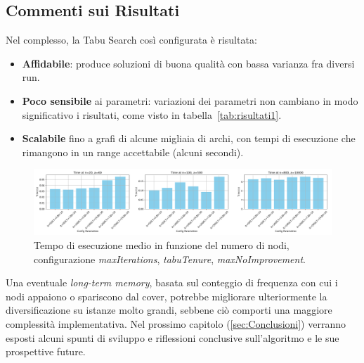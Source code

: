 \subsection{Commenti sui Risultati}

Nel complesso, la Tabu Search così configurata è risultata:
\begin{itemize}
    \item \textbf{Affidabile}: produce soluzioni di buona qualità con bassa varianza fra diversi run.
    \item \textbf{Poco sensibile} ai parametri: variazioni dei parametri non cambiano in modo significativo i risultati, come visto in tabella~\ref{tab:risultati1}.
    \item \textbf{Scalabile} fino a grafi di alcune migliaia di archi, con tempi di esecuzione che rimangono in un range accettabile (alcuni secondi).
\end{itemize}

\begin{figure}[h!]
\centering
\includegraphics[width=1\textwidth]{img/scalability_plot.png} %
\caption{Tempo di esecuzione medio in funzione del numero di nodi, configurazione \emph{maxIterations}, \emph{tabuTenure}, \emph{maxNoImprovement}.}
\label{fig:scalability}
\end{figure}

Una eventuale \emph{long-term memory}, basata sul conteggio di frequenza con cui i nodi appaiono o spariscono dal cover, potrebbe migliorare ulteriormente la diversificazione su istanze molto grandi, sebbene ciò comporti una maggiore complessità implementativa. Nel prossimo capitolo (\ref{sec:Conclusioni}) verranno esposti alcuni spunti di sviluppo e riflessioni conclusive sull'algoritmo e le sue prospettive future.

